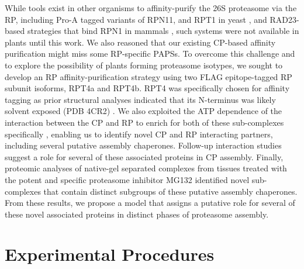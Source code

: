	While tools exist in other organisms to affinity-purify the 26S proteasome via the RP, including Pro-A tagged variants of RPN11, and RPT1 in yeast \citep{leggett05, leggett02}, and RAD23-based strategies that bind RPN1 in mammals \citep{besche09}, such systems were not available in plants until this work. We also reasoned that our existing CP-based affinity purification might miss some RP-specific PAPSs. To overcome this challenge and to explore the possibility of plants forming proteasome isotypes, we sought to develop an RP affinity-purification strategy using two FLAG epitope-tagged RP subunit isoforms, RPT4a and RPT4b. RPT4 was specifically chosen for affinity tagging as prior structural analyses indicated that its N-terminus was likely solvent exposed (PDB 4CR2) \citep{beck12}.   We also exploited the ATP dependence of the interaction between the CP and RP to enrich for both of these sub-complexes specifically \citep{book10, liu06}, enabling us to identify novel CP and RP interacting partners, including several putative assembly chaperones. Follow-up interaction studies suggest a role for several of these associated proteins in CP assembly. Finally, proteomic analyses of native-gel separated complexes from tissues treated with the potent and specific proteasome inhibitor MG132 identified novel sub-complexes that contain distinct subgroups of these putative assembly chaperones. From these results, we propose a model that assigns a putative role for several of these novel associated proteins in distinct phases of proteasome assembly.
 
\section{Experimental Procedures}


